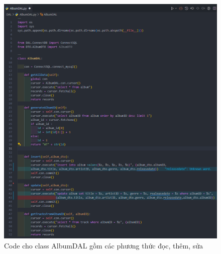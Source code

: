 \documentclass[a4paper]{article}
\begin{document}
\clearpage
\newpage
\begin{figure}[h]
	\centering
	\includegraphics[width=\textwidth]{albumDAL.png}
	\caption{Code cho class AlbumDAL gồm các phương thức đọc, thêm, sửa}
\end{figure}
\end{document}
